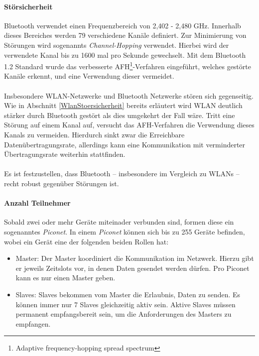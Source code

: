             \paragraph{Störsicherheit}
                Bluetooth verwendet einen Frequenzbereich von 2,402 - 2,480 GHz. Innerhalb
                dieses Bereiches werden 79 verschiedene Kanäle definiert. Zur Minimierung
                von Störungen wird sogenannts \textsl{Channel-Hopping} verwendet. Hierbei
                wird der verwendete Kanal bis zu 1600 mal pro Sekunde gewechselt. Mit dem
                Bluetooth 1.2 Standard wurde das verbesserte  
                AFH\footnote{Adaptive frequency-hopping spread spectrum}-Verfahren 
                eingeführt, welches gestörte Kanäle erkennt, und eine Verwendung
                dieser vermeidet.\\
                \\
                Insbesondere WLAN-Netzwerke und Bluetooth Netzwerke stören sich 
                gegenseitig. Wie in Abschnitt \ref{WlanStoersicherheit} bereits
                erläutert wird WLAN deutlich stärker durch Bluetooth gestört
                als dies umgekehrt der Fall wäre. Tritt eine Störung auf einem
                Kanal auf, versucht das AFH-Verfahren die Verwendung dieses
                Kanals zu vermeiden. Hierdurch sinkt zwar die Erreichbare
                Datenübertragungsrate, allerdings kann eine Kommunikation mit
                verminderter Übertragungsrate weiterhin stattfinden.\\
                 \\
                 Es ist festzustellen, dass Bluetooth -- insbesondere im Vergleich
                 zu WLANs -- recht robust gegenüber Störungen ist.

            \paragraph{Anzahl Teilnehmer}
                Sobald zwei oder mehr Geräte miteinader verbunden sind, formen diese ein
                sogenanntes \textsl{Piconet}. In einem \textsl{Piconet} können sich bis
                zu 255 Geräte befinden, wobei ein Gerät eine der folgenden beiden Rollen
                hat:

                \begin{itemize}
                    \item{Master:} Der Master koordiniert die Kommunikation im Netzwerk.
                                   Hierzu gibt er jeweils Zeitslots vor, in denen
                                   Daten gesendet werden dürfen. Pro Piconet kann
                                   es nur einen Master geben.
                    \item{Slaves:} Slaves bekommen vom Master die Erlaubnis, Daten zu senden.
                                   Es können immer nur 7 Slaves gleichzeitig aktiv sein.
                                   Aktive Slaves müssen permanent empfangsbereit sein,
                                   um die Anforderungen des Masters zu empfangen. 
                \end{itemize}

